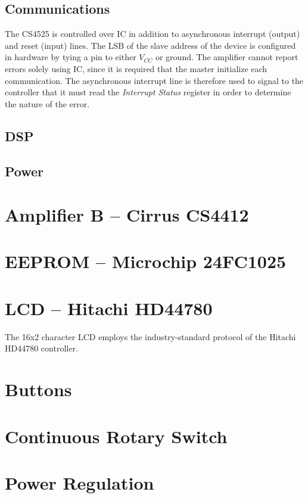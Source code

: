 \subsection{Communications}
The CS4525 is controlled over IC in addition to asynchronous interrupt (output) and reset (input) lines. The LSB of the slave address of the device is configured in hardware by tying a pin to either $V_{CC}$ or ground. The amplifier cannot report errors solely using IC, since it is required that the master initialize each communication. The asynchronous interrupt line is therefore used to signal to the controller that it must read the \textit{Interrupt Status} register in order to determine the nature of the error.
\subsection{DSP}
\subsection{Power}


\section{Amplifier B -- Cirrus CS4412}

\section{EEPROM -- Microchip 24FC1025}

\section{LCD -- Hitachi HD44780}
The 16x2 character LCD employs the industry-standard protocol of the Hitachi HD44780 controller.

\section{Buttons}

\section{Continuous Rotary Switch}

\section{Power Regulation}



